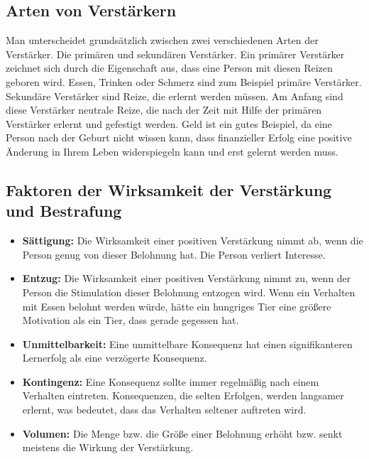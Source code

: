 		
		\subsection{Arten von Verstärkern}
		
		Man unterscheidet grundsätzlich zwischen zwei verschiedenen Arten der Verstärker. Die primären und sekundären Verstärker. 
Ein primärer Verstärker zeichnet sich durch die Eigenschaft aus, dass eine Person mit diesen Reizen geboren wird. Essen, Trinken oder Schmerz sind zum Beispiel primäre Verstärker. \\
Sekundäre Verstärker sind Reize, die erlernt werden müssen. Am Anfang sind diese Verstärker neutrale Reize, die nach der Zeit mit Hilfe der primären Verstärker erlernt und gefestigt werden. Geld ist ein gutes Beispiel, da eine Person nach der Geburt nicht wissen kann, dass finanzieller Erfolg eine positive Änderung in Ihrem Leben widerspiegeln kann und erst gelernt werden muss. \\

		\subsection{Faktoren der Wirksamkeit der Verstärkung und Bestrafung}
		
		\begin{itemize}
			\item \textbf{Sättigung:} Die Wirksamkeit einer positiven Verstärkung nimmt ab, wenn die Person genug von dieser Belohnung hat. Die Person verliert Interesse.
			\item \textbf{Entzug:} Die Wirksamkeit einer positiven Verstärkung nimmt zu, wenn der Person die Stimulation dieser Belohnung entzogen wird. Wenn ein Verhalten mit Essen belohnt werden würde, hätte ein hungriges Tier eine größere Motivation als ein Tier, dass gerade gegessen hat. 
			\item \textbf{Unmittelbarkeit:} Eine unmittelbare Konsequenz hat einen signifikanteren Lernerfolg als eine verzögerte Konsequenz. 
			\item \textbf{Kontingenz:} Eine Konsequenz sollte immer regelmäßig nach einem Verhalten eintreten. Konsequenzen, die selten Erfolgen, werden langsamer erlernt, was bedeutet, dass das Verhalten seltener auftreten wird. 
			\item \textbf{Volumen:} Die Menge bzw. die Größe einer Belohnung erhöht bzw. senkt meistens die Wirkung der Verstärkung. 
		\end{itemize}
		
